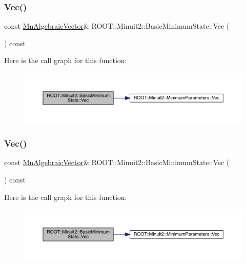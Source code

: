 \subsubsection{\texorpdfstring{Vec()}{Vec()}\hspace{0.1cm}{\footnotesize\ttfamily [1/2]}}
{\footnotesize\ttfamily const \mbox{\hyperlink{namespaceROOT_1_1Minuit2_a62ed97730a1ca8d3fbaec64a19aa11c9}{Mn\+Algebraic\+Vector}}\& R\+O\+O\+T\+::\+Minuit2\+::\+Basic\+Minimum\+State\+::\+Vec (\begin{DoxyParamCaption}{ }\end{DoxyParamCaption}) const\hspace{0.3cm}{\ttfamily [inline]}}

Here is the call graph for this function\+:
\nopagebreak
\begin{figure}[H]
\begin{center}
\leavevmode
\includegraphics[width=350pt]{d0/db1/classROOT_1_1Minuit2_1_1BasicMinimumState_a43ea742b5bd55d2c4e9d6b75308fb875_cgraph}
\end{center}
\end{figure}
\mbox{\label{classROOT_1_1Minuit2_1_1BasicMinimumState_a43ea742b5bd55d2c4e9d6b75308fb875}} 
\subsubsection{\texorpdfstring{Vec()}{Vec()}\hspace{0.1cm}{\footnotesize\ttfamily [2/2]}}
{\footnotesize\ttfamily const \mbox{\hyperlink{namespaceROOT_1_1Minuit2_a62ed97730a1ca8d3fbaec64a19aa11c9}{Mn\+Algebraic\+Vector}}\& R\+O\+O\+T\+::\+Minuit2\+::\+Basic\+Minimum\+State\+::\+Vec (\begin{DoxyParamCaption}{ }\end{DoxyParamCaption}) const\hspace{0.3cm}{\ttfamily [inline]}}

Here is the call graph for this function\+:
\nopagebreak
\begin{figure}[H]
\begin{center}
\leavevmode
\includegraphics[width=350pt]{d0/db1/classROOT_1_1Minuit2_1_1BasicMinimumState_a43ea742b5bd55d2c4e9d6b75308fb875_cgraph}
\end{center}
\end{figure}


